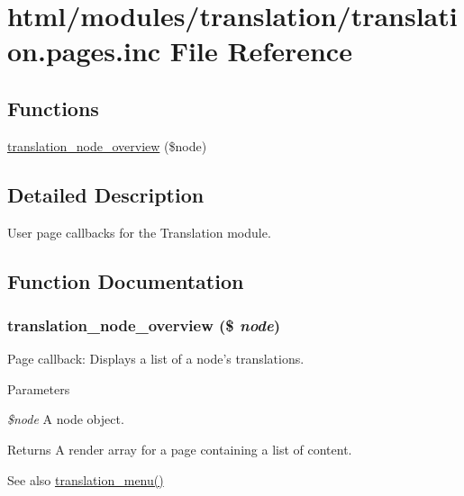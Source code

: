 \hypertarget{translation_8pages_8inc}{
\section{html/modules/translation/translation.pages.inc File Reference}
\label{translation_8pages_8inc}
}
\subsection*{Functions}
\begin{DoxyCompactItemize}
\item 
\hyperlink{translation_8pages_8inc_af25cd96e67d0bf2a6ac940f101b24d1e}{translation\_\-node\_\-overview} (\$node)
\end{DoxyCompactItemize}


\subsection{Detailed Description}
User page callbacks for the Translation module. 

\subsection{Function Documentation}
\hypertarget{translation_8pages_8inc_af25cd96e67d0bf2a6ac940f101b24d1e}{
\subsubsection[{translation\_\-node\_\-overview}]{\setlength{\rightskip}{0pt plus 5cm}translation\_\-node\_\-overview (\$ {\em node})}}
\label{translation_8pages_8inc_af25cd96e67d0bf2a6ac940f101b24d1e}
Page callback: Displays a list of a node's translations.


\begin{DoxyParams}{Parameters}
\item[{\em \$node}]A node object.\end{DoxyParams}
\begin{DoxyReturn}{Returns}
A render array for a page containing a list of content.
\end{DoxyReturn}
\begin{DoxySeeAlso}{See also}
\hyperlink{translation_8module_a31c2f0307fce1bcb4da69eda5131f4c5}{translation\_\-menu()} 
\end{DoxySeeAlso}

